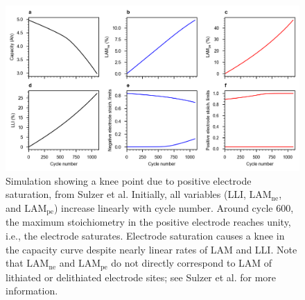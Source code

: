 \documentclass[journal=jpclcd,manuscript=article]{achemso}
\begin{document}
\begin{figure}[p]
    \centering
    \includegraphics[width=\linewidth]{figures/stoich_knee.png}
    \caption{Simulation showing a knee point due to positive electrode saturation, from Sulzer et al.\cite{sulzer_accelerated_2021} Initially, all variables (LLI, $\mathrm{LAM_{ne}}$, and $\mathrm{LAM_{pe}}$) increase linearly with cycle number. Around cycle 600, the maximum stoichiometry in the positive electrode reaches unity, i.e., the electrode saturates. Electrode saturation causes a knee in the capacity curve despite nearly linear rates of LAM and LLI.
    Note that $\mathrm{LAM_{ne}}$ and $\mathrm{LAM_{pe}}$ do not directly correspond to LAM of lithiated or delithiated electrode sites; see Sulzer et al.\cite{sulzer_accelerated_2021} for more information.}
    \label{fig:electrode_sat_simulation}
\end{figure}

\end{document}
